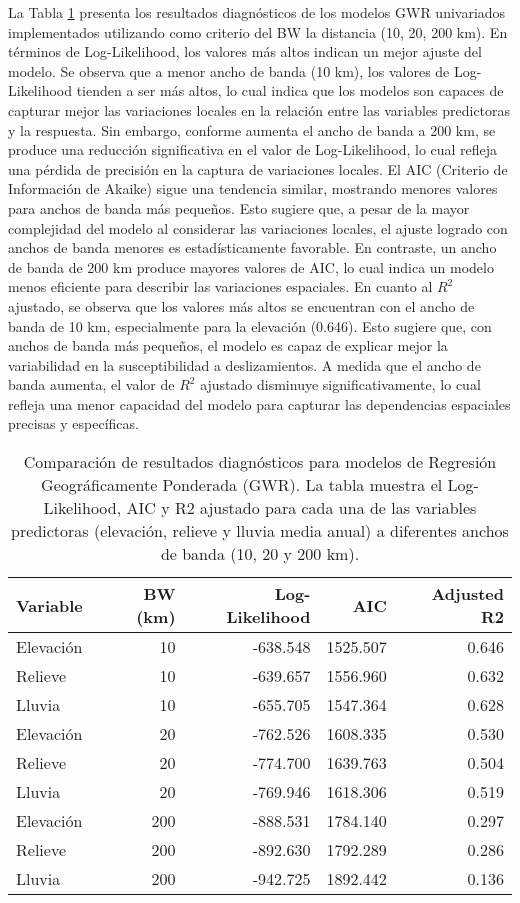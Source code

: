 \documentclass[
  manuscript=article,  
  layout=preprint,  
]{format}
\begin{document}
La Tabla \ref{tab:comparison_results} presenta los resultados diagnósticos de los modelos GWR univariados implementados utilizando como criterio del BW la distancia (10, 20, 200 km). En términos de Log-Likelihood, los valores más altos indican un mejor ajuste del modelo. Se observa que a menor ancho de banda (10 km), los valores de Log-Likelihood tienden a ser más altos, lo cual indica que los modelos son capaces de capturar mejor las variaciones locales en la relación entre las variables predictoras y la respuesta. Sin embargo, conforme aumenta el ancho de banda a 200 km, se produce una reducción significativa en el valor de Log-Likelihood, lo cual refleja una pérdida de precisión en la captura de variaciones locales. El AIC (Criterio de Información de Akaike) sigue una tendencia similar, mostrando menores valores para anchos de banda más pequeños. Esto sugiere que, a pesar de la mayor complejidad del modelo al considerar las variaciones locales, el ajuste logrado con anchos de banda menores es estadísticamente favorable. En contraste, un ancho de banda de 200 km produce mayores valores de AIC, lo cual indica un modelo menos eficiente para describir las variaciones espaciales. En cuanto al $R^2$ ajustado, se observa que los valores más altos se encuentran con el ancho de banda de 10 km, especialmente para la elevación (0.646). Esto sugiere que, con anchos de banda más pequeños, el modelo es capaz de explicar mejor la variabilidad en la susceptibilidad a deslizamientos. A medida que el ancho de banda aumenta, el valor de $R^2$ ajustado disminuye significativamente, lo cual refleja una menor capacidad del modelo para capturar las dependencias espaciales precisas y específicas.

\begin{table}
\caption{Comparación de resultados diagnósticos para modelos de Regresión Geográficamente Ponderada (GWR). La tabla muestra el Log-Likelihood, AIC y R2 ajustado para cada una de las variables predictoras (elevación, relieve y lluvia media anual) a diferentes anchos de banda (10, 20 y 200 km).}
\label{tab:comparison_results}
\begin{tabular}{lrrrr}
\toprule
Variable & BW (km) & Log-Likelihood & AIC & Adjusted R2 \\
\midrule
Elevación & 10 & -638.548 & 1525.507 & 0.646 \\
Relieve & 10 & -639.657 & 1556.960 & 0.632 \\
Lluvia & 10 & -655.705 & 1547.364 & 0.628 \\
Elevación & 20 & -762.526 & 1608.335 & 0.530 \\
Relieve & 20 & -774.700 & 1639.763 & 0.504 \\
Lluvia & 20 & -769.946 & 1618.306 & 0.519 \\
Elevación & 200 & -888.531 & 1784.140 & 0.297 \\
Relieve & 200 & -892.630 & 1792.289 & 0.286 \\
Lluvia & 200 & -942.725 & 1892.442 & 0.136 \\
\bottomrule
\end{tabular}
\end{table}
\end{document}
